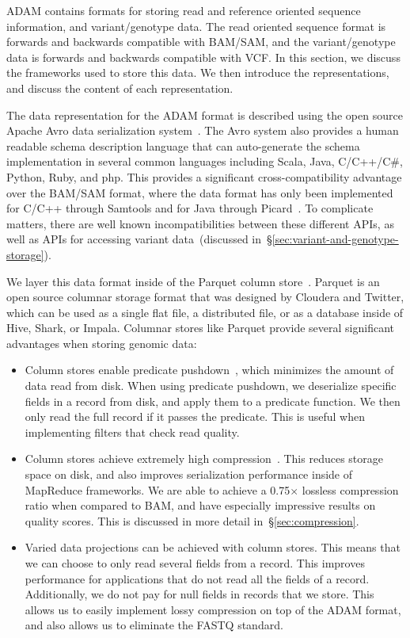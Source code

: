 \documentclass[10pt,twocolumn]{article}
\theoremstyle{plain}
\begin{document}
ADAM contains formats for storing read and reference oriented sequence information, and variant/genotype data.
The read oriented sequence format is forwards and backwards compatible with BAM/SAM, and the variant/genotype
data is forwards and backwards compatible with VCF. In this section, we discuss the frameworks used to store this
data. We then introduce the representations, and discuss the content of each representation.

The data representation for the ADAM format is described using the open source Apache Avro data serialization
system~\cite{avro}. The Avro system also provides a human readable schema description language that can
auto-generate the schema implementation in several common languages including Scala, Java, C/C++/C\#,
Python, Ruby, and php. This provides a significant cross-compatibility advantage over the BAM/SAM format,
where the data format has only been implemented for C/C++ through Samtools and for Java through
Picard~\cite{li09,picard}. To complicate matters, there are well known incompatibilities between these different APIs,
as well as APIs for accessing variant data~(discussed in~\S\ref{sec:variant-and-genotype-storage}).

We layer this data format inside of the Parquet column store~\cite{parquet}. Parquet is an open source columnar storage
format that was designed by Cloudera and Twitter, which can be used as a single flat file, a distributed file, or as a database inside of Hive, Shark, or Impala. Columnar stores like Parquet provide several significant advantages when storing genomic data:

\begin{itemize}
\item Column stores enable predicate pushdown~\cite{lamb12}, which minimizes the amount of data read from disk. When
using predicate pushdown, we deserialize specific fields in a record from disk, and apply them to a predicate function. We
then only read the full record if it passes the predicate. This is useful when implementing filters that check read quality.
\item Column stores achieve extremely high compression~\cite{abadi06}. This reduces storage space on disk, and also improves
serialization performance inside of MapReduce frameworks. We are able to achieve a 0.75$\times$ lossless compression
ratio when compared to BAM, and have especially impressive results on quality scores. This is discussed in more
detail in~\S\ref{sec:compression}.
\item Varied data projections can be achieved with column stores. This means that we can choose to only read several
fields from a record. This improves performance for applications that do not read all the fields of a record. Additionally,
we do not pay for null fields in records that we store. This allows us to easily implement lossy compression on top of the
ADAM format, and also allows us to eliminate the FASTQ standard.
\end{itemize}
\end{document}
